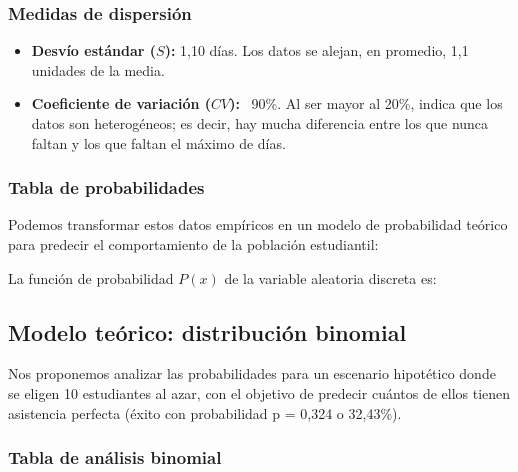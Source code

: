 \subsubsection{Medidas de dispersión}
\begin{itemize}
	\item \textbf{Desvío estándar ($S$):} 1,10 días. Los datos se alejan, en promedio, 1,1 unidades de la media.
	\item \textbf{Coeficiente de variación ($CV$):} ~90\%. Al ser mayor al 20\%, indica que los datos son heterogéneos; es decir, hay mucha diferencia entre los que nunca faltan y los que faltan el máximo de días.
\end{itemize}

\subsubsection{Tabla de probabilidades}
Podemos transformar estos datos empíricos en un modelo de probabilidad teórico para predecir el
comportamiento de la población estudiantil:
\begin{table}[H]
\centering

\caption{Tabla de probabilidades de  (VAD).}
\label{tab:binomial_empirica}
\end{table}

La función de probabilidad $P(x)$ de la variable aleatoria discreta  es:



\newpage
\subsection{Modelo teórico: distribución binomial}
Nos proponemos analizar las probabilidades para un escenario hipotético donde se eligen 10
estudiantes al azar, con el objetivo de predecir cuántos de ellos tienen asistencia
perfecta (éxito con probabilidad p = 0,324 o 32,43\%).

\subsubsection{Tabla de análisis binomial}


